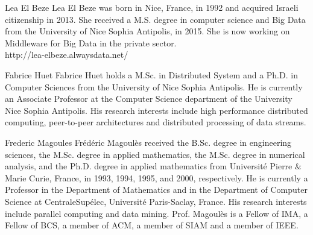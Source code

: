 \documentclass[10pt,journal,compsoc]{IEEEtran}
\begin{document}
\begin{IEEEbiography}
{Lea El Beze}
Lea El Beze was born in Nice, France, in 1992 and acquired Israeli citizenship in 2013. She received a M.S. degree 
in computer science and Big Data from the University of Nice Sophia Antipolis, in 2015. She is now working on 
 Middleware for Big Data in the private sector.
\\
http://lea-elbeze.alwaysdata.net/
\end{IEEEbiography}

\begin{IEEEbiography}
{Fabrice Huet}
Fabrice Huet holds a M.Sc. in Distributed System and a Ph.D. in Computer Sciences from the University of Nice Sophia 
Antipolis. He is currently an Associate Professor at the Computer Science department of the University Nice Sophia 
Antipolis. His research interests include high performance distributed computing, peer-to-peer architectures and 
distributed processing of data streams. 
\end{IEEEbiography}

\begin{IEEEbiography}
{Frederic Magoules}
Fr\'ed\'eric Magoul\`es received the B.Sc. degree in engineering sciences,
the M.Sc. degree in applied mathematics, the M.Sc. degree in numerical analysis,
and the Ph.D. degree in applied mathematics from Universit\'e Pierre $\&$
Marie Curie, France, in 1993, 1994, 1995, and 2000, respectively.
He is currently a Professor in the Department of Mathematics and in the Department
of Computer Science at CentraleSup\'elec, Universit\'e Paris-Saclay, France. His research
interests include parallel computing and data mining.
Prof. Magoul\`es is a Fellow of IMA, a Fellow of BCS, a member of ACM,
a member of SIAM and a member of IEEE.
\end{IEEEbiography}
\end{document}
